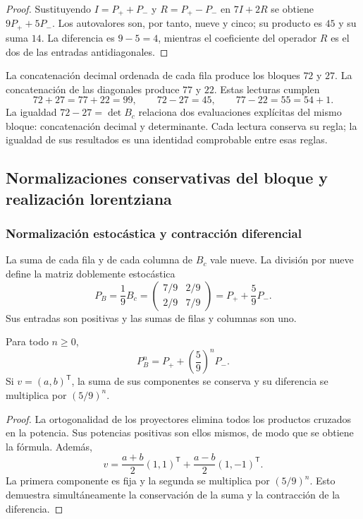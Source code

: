 \begin{proof}
Sustituyendo $I=P_++P_-$ y $R=P_+-P_-$ en $7I+2R$ se obtiene $9P_++5P_-$. Los autovalores son, por tanto, nueve y cinco; su producto es $45$ y su suma $14$. La diferencia es $9-5=4$, mientras el coeficiente del operador $R$ es el dos de las entradas antidiagonales.
\end{proof}

La concatenación decimal ordenada de cada fila produce los bloques $72$ y $27$. La concatenación de las diagonales produce $77$ y $22$. Estas lecturas cumplen
\[
 72+27=77+22=99,
 \qquad72-27=45,
 \qquad77-22=55=54+1.
\]
La igualdad $72-27=\det B_c$ relaciona dos evaluaciones explícitas del mismo bloque: concatenación decimal y determinante. Cada lectura conserva su regla; la igualdad de sus resultados es una identidad comprobable entre esas reglas.

\subsection{Normalizaciones conservativas del bloque y realización lorentziana}
\label{geo:lorentz}

\subsubsection{Normalización estocástica y contracción diferencial}

La suma de cada fila y de cada columna de $B_c$ vale nueve. La división por nueve define la matriz doblemente estocástica
\[
 P_B=\frac19B_c
 =\begin{pmatrix}7/9&2/9\\2/9&7/9\end{pmatrix}
 =P_++\frac59P_-.
\]
Sus entradas son positivas y las sumas de filas y columnas son uno.

\begin{proposicion}
\label{geo:prop-markov}
Para todo $n\geq0$,
\[
 P_B^n=P_++\left(\frac59\right)^nP_-.
\]
Si $v=(a,b)^{\mathsf T}$, la suma de sus componentes se conserva y su diferencia se multiplica por $(5/9)^n$.
\end{proposicion}

\begin{proof}
La ortogonalidad de los proyectores elimina todos los productos cruzados en la potencia. Sus potencias positivas son ellos mismos, de modo que se obtiene la fórmula. Además,
\[
 v=\frac{a+b}{2}(1,1)^{\mathsf T}
   +\frac{a-b}{2}(1,-1)^{\mathsf T}.
\]
La primera componente es fija y la segunda se multiplica por $(5/9)^n$. Esto demuestra simultáneamente la conservación de la suma y la contracción de la diferencia.
\end{proof}


